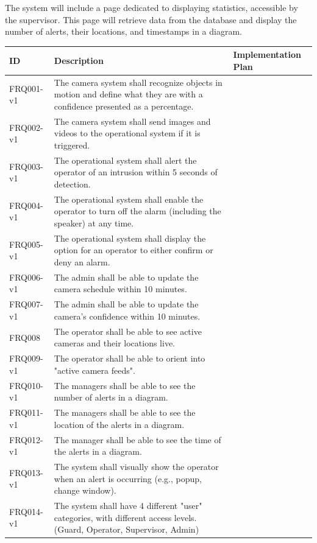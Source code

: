 \documentclass{article}
\begin{document}
The system will include a page dedicated to displaying statistics, accessible by the supervisor. This page will retrieve data from the database and display the number of alerts, their locations, and timestamps in a diagram. 
\clearpage
\begin{table}[h] 
\centering
\begin{tabular}{|l|p{8cm}|p{5cm}|}
\hline
\textbf{ID} & \textbf{Description} & \textbf{Implementation Plan} \\
\hline
FRQ001-v1 & The camera system shall recognize objects in motion and define what they are with a confidence presented as a percentage. &  \\
\hline
FRQ002-v1 & The camera system shall send images and videos to the operational system if it is triggered. &  \\
\hline
FRQ003-v1 & The operational system shall alert the operator of an intrusion within 5 seconds of detection. &  \\
\hline
FRQ004-v1 & The operational system shall enable the operator to turn off the alarm (including the speaker) at any time. &  \\
\hline
FRQ005-v1 & The operational system shall display the option for an operator to either confirm or deny an alarm. &  \\
\hline
FRQ006-v1 & The admin shall be able to update the camera schedule within 10 minutes. &  \\
\hline
FRQ007-v1 & The admin shall be able to update the camera’s confidence within 10 minutes. &  \\
\hline
FRQ008 & The operator shall be able to see active cameras and their locations live. &  \\
\hline
FRQ009-v1 & The operator shall be able to orient into "active camera feeds". &  \\
\hline
FRQ010-v1 & The managers shall be able to see the number of alerts in a diagram. &  \\
\hline
FRQ011-v1 & The managers shall be able to see the location of the alerts in a diagram. &  \\
\hline
FRQ012-v1 & The manager shall be able to see the time of the alerts in a diagram. &  \\
\hline
FRQ013-v1 & The system shall visually show the operator when an alert is occurring (e.g., popup, change window). &  \\
\hline
FRQ014-v1 & The system shall have 4 different "user" categories, with different access levels. (Guard, Operator, Supervisor, Admin) &  \\

\end{tabular}
\end{table}
\end{document}

